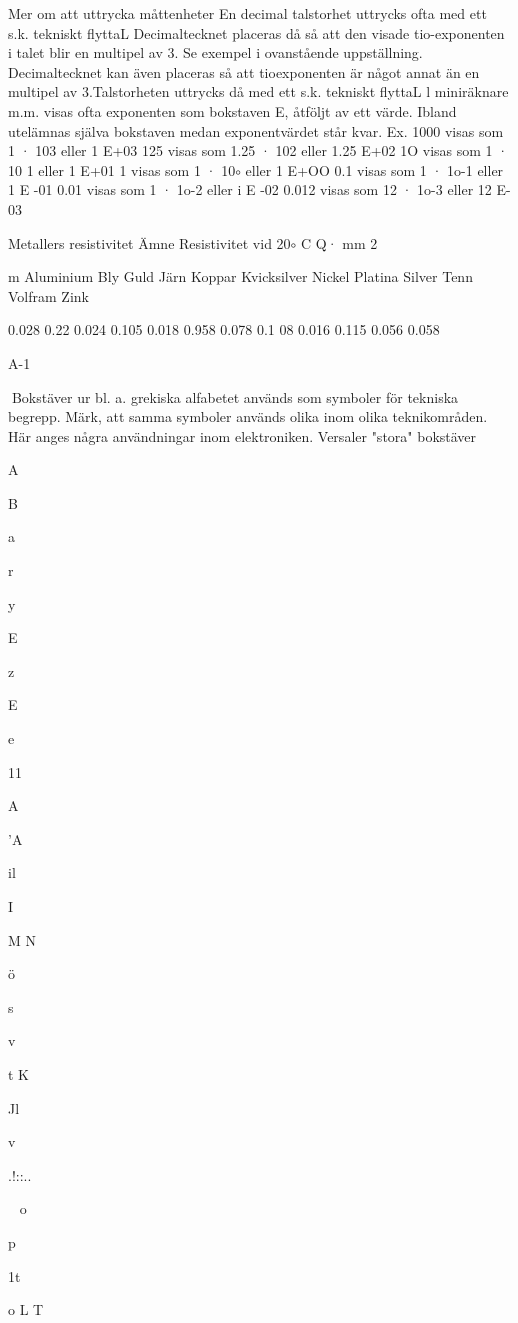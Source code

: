 \documentclass[a4paper,twoside,twocolumn,openright]{book}
\begin{document}
{{{{Mer om att uttrycka måttenheter
En decimal talstorhet uttrycks ofta med ett s.k. tekniskt flyttaL Decimaltecknet placeras då så att den
visade tio-exponenten i talet blir en multipel av 3. Se
exempel i ovanstående uppställning.
Decimaltecknet kan även placeras så att tioexponenten är något annat än en multipel av 3.Talstorheten uttrycks då med ett s.k. tekniskt flyttaL
l miniräknare m.m. visas ofta exponenten som
bokstaven E, åtföljt av ett värde. Ibland utelämnas
själva bokstaven medan exponentvärdet står kvar.
Ex. 1000 visas som 1 · 103
eller 1 E+03
125 visas som 1.25 · 102 eller 1.25 E+02
1O
visas som 1 · 10 1
eller 1 E+01
1
visas som 1 · 10$\circ$
eller 1 E+OO
0.1
visas som 1 · 1o-1
eller 1 E -01
0.01 visas som 1 · 1o-2
eller i E -02
0.012 visas som 12 · 1o-3 eller 12 E-03

Metallers resistivitet
Ämne
Resistivitet
vid 20$\circ$ C
Q· mm 2

m
Aluminium
Bly
Guld
Järn
Koppar
Kvicksilver
Nickel
Platina
Silver
Tenn
Volfram
Zink

0.028
0.22
0.024
0.105
0.018
0.958
0.078
0.1 08
0.016
0.115
0.056
0.058

A-1

Bokstäver ur bl. a. grekiska alfabetet används som symboler för tekniska begrepp.
Märk, att samma symboler används olika inom olika teknikområden.
Här anges några användningar inom elektroniken.
Versaler
"stora"
bokstäver

A

B

a
~

r

y

E

z

E

e

11

A

'A

il

I

M
N

ö

s

v

t
K

Jl

v

.!::..

~
o

p

1t

o
L
T

}}}}
\end{document}
